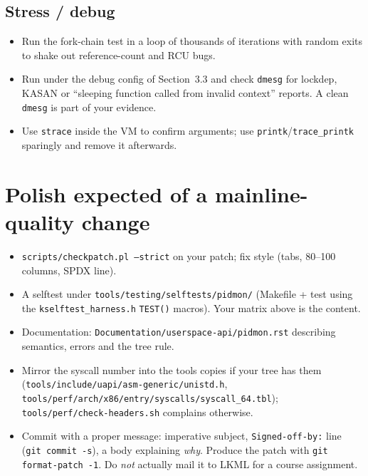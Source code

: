 \documentclass[11pt,a4paper]{article}
\newcommand{\kfile}[1]{\texttt{\small #1}}
\begin{document}
\subsection{Stress / debug}
\begin{itemize}
  \item Run the fork-chain test in a loop of thousands of iterations with random exits to shake out reference-count and RCU bugs.
  \item Run under the debug config of Section~3.3 and check \texttt{dmesg} for lockdep, KASAN or ``sleeping function called from invalid context'' reports. A clean \texttt{dmesg} is part of your evidence.
  \item Use \texttt{strace} inside the VM to confirm arguments; use \texttt{printk}/\texttt{trace\_printk} sparingly and remove it afterwards.
\end{itemize}

\section{Polish expected of a mainline-quality change}
\begin{itemize}
  \item \texttt{scripts/checkpatch.pl --strict} on your patch; fix style (tabs, 80--100 columns, SPDX line).
  \item A selftest under \kfile{tools/testing/selftests/pidmon/} (Makefile + test using the \texttt{kselftest\_harness.h} \texttt{TEST()} macros). Your matrix above is the content.
  \item Documentation: \kfile{Documentation/userspace-api/pidmon.rst} describing semantics, errors and the tree rule.
  \item Mirror the syscall number into the tools copies if your tree has them (\kfile{tools/include/uapi/asm-generic/unistd.h}, \kfile{tools/perf/arch/x86/entry/syscalls/syscall\_64.tbl}); \texttt{tools/perf/check-headers.sh} complains otherwise.
  \item Commit with a proper message: imperative subject, \texttt{Signed-off-by:} line (\texttt{git commit -s}), a body explaining \emph{why}. Produce the patch with \texttt{git format-patch -1}. Do \emph{not} actually mail it to LKML for a course assignment.
\end{itemize}

\end{document}
